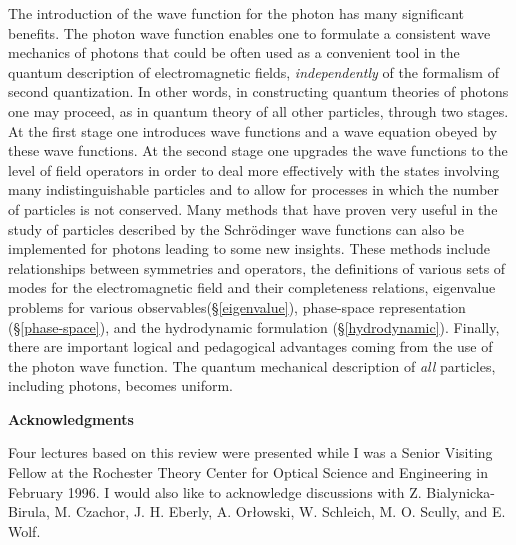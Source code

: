\documentclass{article}
\begin{document}
The introduction of the wave function for the photon has many significant
benefits. The photon wave function enables one to formulate a consistent
wave mechanics of photons that could be often used as a convenient tool in
the quantum description of electromagnetic fields, {\em independently} of
the formalism of second quantization. In other words, in constructing
quantum theories of photons one may proceed, as in quantum theory of all
other particles, through two stages. At the first stage one introduces wave
functions and a wave equation obeyed by these wave functions. At the second
stage one upgrades the wave functions to the level of field operators in
order to deal more effectively with the states involving many
indistinguishable particles and to allow for processes in which the number
of particles is not conserved. Many methods that have proven very useful in
the study of particles described by the Schr\"odinger wave functions can
also be implemented for photons leading to some new insights. These methods
include relationships between symmetries and operators, the definitions of
various sets of modes for the electromagnetic field and their completeness
relations, eigenvalue problems for various observables(\S \ref{eigenvalue}),
phase-space representation (\S \ref{phase-space}), and
the hydrodynamic formulation (\S \ref{hydrodynamic}). Finally, there are
important logical and pedagogical advantages coming from the use of the
photon wave function. The quantum mechanical description of {\em all}
particles, including photons, becomes uniform.

\vspace{.5cm}
\centerline{\bf Acknowledgments}
\vspace{.5cm}

Four lectures based on this review were presented while I was a Senior
Visiting Fellow at the Rochester Theory Center for Optical Science and
Engineering in February 1996. I would also like to acknowledge discussions
with Z. Bialynicka-Birula, M. Czachor, J. H. Eberly, A. Or\l owski, W.
Schleich, M. O. Scully, and E. Wolf.
\end{document}
